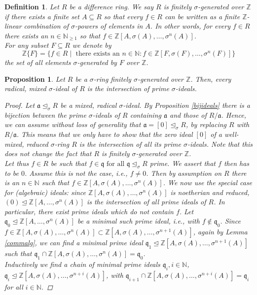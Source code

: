 \documentclass{article}
\def\NE{\mathbb{N}_{\geq1}}
\def\N{\mathbb{N}}
\def\Z{\mathbb{Z}}
\def\a{\mathfrak{a}}
\def\q{\mathfrak{q}}
\def\s{\sigma}
\def\si{\unlhd_{\sigma}}
\def\fa{\text{ for all }}
\newenvironment{bew}{\begin{proof}[Proof]}{\end{proof}}
\theoremstyle{plain}
\newtheorem{prop}[Satz]{Proposition}
\newtheorem{defn}[Satz]{Definition}
\theoremstyle{definition}
\begin{document}
\begin{defn}
Let $R$ be a difference ring. We say $R$ is \emph{finitely $\s$-generated over $\Z$} if there exists a finite set $A \subseteq R$ so that every $f \in R$ can be written as a finite $\Z$-linear combination of $\s$-powers of elements in $A$. In other words,
for every $f \in R$ there exists an $n \in \NE$ so that $f \in \Z[A,\sigma(A),\ldots,\s^n(A)]$. \\ 
\indent For any subset $F \subseteq R$ we denote by $$\Z\{F\} = \{ f \in R \mid \text{ there exists an } n \in \N: f \in \Z[F, \s(F), \ldots, \s^n(F)] \}$$ the set of all elements $\s$-generated by $F$ over $\Z$.
\end{defn}\index{finitely $\s$-generated over $\Z$}

\begin{prop}\label{mixedintersectionprimesfinite}
Let $R$ be a $\s$-ring finitely $\s$-generated over $\Z$. Then, every radical, mixed $\s$-ideal of $R$ is the intersection of prime $\s$-ideals.
\begin{bew}
Let $\a \si R$ be a mixed, radical $\s$-ideal. By Proposition \ref{bijideals} there is a bijection between the prime $\s$-ideals of $R$ containing $\a$ and those of $R/\a$. Hence, we can assume without loss of generality that $\a = [0] \si R$,
 by replacing $R$ with $R/\a$. This means that we only have to show that the zero ideal $[0]$ of a well-mixed, reduced $\s$-ring $R$ is the intersection of all its prime $\s$-ideals. Note that this does not change the fact
that $R$ is finitely $\s$-generated over $\Z$. \\
\indent Let thus $f \in R$ be such that $f \in \q \fa \q \si R$ prime. We assert that $f$ then has to be $0$. Assume this is not the case, i.e., $f \neq 0$. Then by assumption on $R$ there is an $n \in \N$ such that $f \in \Z[A,\s(A),\ldots,\s^n(A)]$.
We now use the special case for (algebraic) ideals: since $\Z[A,\s(A),\ldots,\s^n(A)]$ is noetherian and reduced, $(0) \unlhd \Z[A,\ldots,\s^n(A)]$ is the intersection of all prime ideals of $R$. In particular, there exist prime ideals which do not contain $f$.
Let $\q_0 \unlhd \Z[A,\ldots,\s^n(A)]$ be a minimal such prime ideal, i.e., with $f \notin \q_0$. Since $f \in \Z[A,\s(A),\ldots,\s^n(A)] \subset \Z[A,\s(A),\ldots,\s^{n+1}(A)]$, again by Lemma \ref{commalg}, we can find a minimal prime ideal $\q_1 \unlhd \Z[A,\s(A),\ldots,\s^{n+1}(A)]$
such that $\q_1 \cap \Z[A,\s(A),\ldots,\s^{n}(A)] = \q_0$. \\
\indent Inductively we find a chain of minimal prime ideals $\q_i, i \in \N$, $\q_i \unlhd \Z[A,\s(A),\ldots,\s^{n+i}(A)]$, with $\q_{i+1} \cap \Z[A,\s(A),\ldots,\s^{n+i}(A)] = \q_i$ for all $i \in \N$.

\end{bew}
\end{prop}
\end{document}
